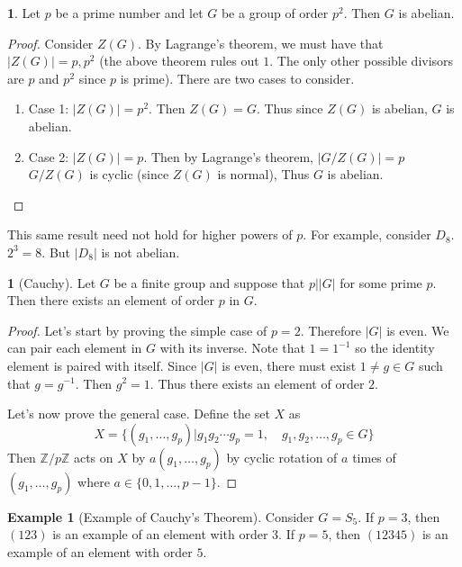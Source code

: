 \documentclass[12pt]{article}
\theoremstyle{definition}
\newtheorem{theorem}{\color{ForestGreen}{\textbf{Theorem}}}
\newtheorem{corollary}{\color{ForestGreen}{\textbf{Corollary}}}
\newcommand{\Z}{\mathbb{Z}}
\newtheorem{example}{\color{WildStrawberry}Example}
\theoremstyle{definition}
\begin{document}
\begin{corollary}
	Let $p$ be a prime number and let $G$ be a group of order $p^2$. Then $G$ is abelian.
\end{corollary}
\begin{proof}	
	Consider $Z(G)$. By Lagrange's theorem, we must have that $|Z(G)| = p, p^2$ (the above theorem rules out $1$. The only other possible divisors are $p$ and $p^2$ since $p$ is prime). There are two cases to consider.
	\begin{enumerate}
		\item Case 1: $|Z(G)| = p^2$. Then $Z(G) = G$. Thus since $Z(G)$ is abelian, $G$ is abelian.
		\item Case 2: $|Z(G)| = p$. Then by Lagrange's theorem, $| G / Z(G) | = p$ $G / Z(G)$ is cyclic (since $Z(G)$ is normal), Thus $G$ is abelian.
	\end{enumerate}
\end{proof}

This same result need not hold for higher powers of $p$. For example, consider $D_8$. $2^3 = 8$. But $|D_8|$ is not abelian. 

\begin{theorem}[Cauchy]
	Let $G$ be a finite group and suppose that $p \big\vert |G|$ for some prime $p$. Then there exists an element of order $p$ in $G$. 
\end{theorem}

\begin{proof}
	Let's start by proving the simple case of $p=2$. Therefore $|G|$ is even. We can pair each element in $G$ with its inverse. Note that $1 = 1^{-1}$ so the identity element is paired with itself. Since $|G|$ is even, there must exist $1 \neq g \in G$ such that $g = g^{-1}$. Then $g^2 = 1$. Thus there exists an element of order $2$. 

	Let's now prove the general case. Define the set $X$ as 
	\begin{equation}
		X = \{(g_1, \ldots, g_p) | g_1g_2 \cdots g_p = 1, \quad g_1, g_2, \ldots, g_p \in G\}
	\end{equation}
	Then $\Z / p \Z$ acts on $X$ by $a(g_1, \ldots, g_p)$ by cyclic rotation of $a$ times of $(g_1, \ldots, g_p)$ where $a \in \{0,1,\ldots, p-1\}$. 
\end{proof}

\begin{example}[Example of Cauchy's Theorem]
	Consider $G = S_5$. If $p=3$, then $(123)$ is an example of an element with order $3$. If $p=5$, then $(12345)$ is an example of an element with order $5$. 
\end{example}
\end{document}
